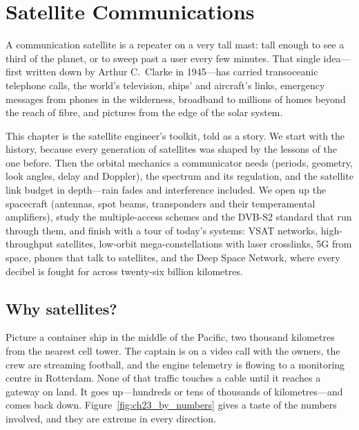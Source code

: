 \chapter{Satellite Communications}
\label{ch:satellite}

\begin{chapterintro}
A communication satellite is a repeater on a very tall mast: tall enough to see a third of the
planet, or to sweep past a user every few minutes. That single idea---first written down by
Arthur C.~Clarke in 1945---has carried transoceanic telephone calls, the world's television,
ships' and aircraft's links, emergency messages from phones in the wilderness, broadband to
millions of homes beyond the reach of fibre, and pictures from the edge of the solar system.

This chapter is the satellite engineer's toolkit, told as a story. We start with the history,
because every generation of satellites was shaped by the lessons of the one before. Then the
orbital mechanics a communicator needs (periods, geometry, look angles, delay and Doppler), the
spectrum and its regulation, and the satellite link budget in depth---rain fades and interference
included. We open up the spacecraft (antennas, spot beams, transponders and their temperamental
amplifiers), study the multiple-access schemes and the DVB-S2 standard that run through them, and
finish with a tour of today's systems: VSAT networks, high-throughput satellites, low-orbit
mega-constellations with laser crosslinks, 5G from space, phones that talk to satellites, and the
Deep Space Network, where every decibel is fought for across twenty-six billion kilometres.
\end{chapterintro}


\section{Why satellites?}
\label{sec:ch23:why}

Picture a container ship in the middle of the Pacific, two thousand kilometres from the nearest
cell tower. The captain is on a video call with the owners, the crew are streaming football, and
the engine telemetry is flowing to a monitoring centre in Rotterdam. None of that traffic touches
a cable until it reaches a gateway on land. It goes up---hundreds or tens of thousands of
kilometres---and comes back down. Figure~\ref{fig:ch23_by_numbers} gives a taste of the numbers
involved, and they are extreme in every direction.

